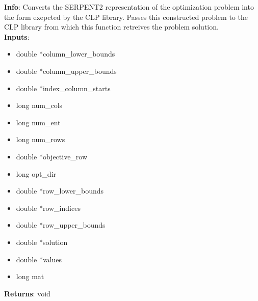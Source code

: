 \textbf{Info}: Converts the SERPENT2 representation of the optimization problem
into the form exepcted by the CLP library. Passes this constructed problem
to the CLP library from which this function retreives the problem solution. \\

\noindent \textbf{Inputs}:
\begin{itemize}
\item{double *column\_lower\_bounds}
\item{double *column\_upper\_bounds}
\item{double *index\_column\_starts}
\item{long num\_cols}
\item{long num\_ent}
\item{long num\_rows}
\item{double *objective\_row}
\item{long opt\_dir}
\item{double *row\_lower\_bounds}
\item{double *row\_indices}
\item{double *row\_upper\_bounds}
\item{double *solution}
\item{double *values}
\item{long mat}
\end{itemize}

\noindent \textbf{Returns}: void
